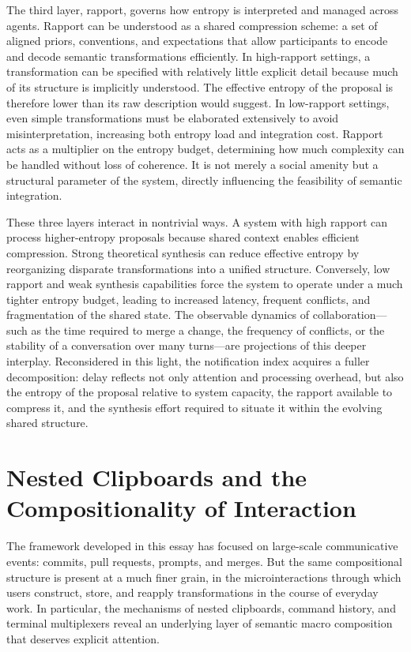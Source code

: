 \documentclass[12pt, letterpaper]{article}
\begin{document}
The third layer, rapport, governs how entropy is interpreted and managed across agents. Rapport can be understood as a shared compression scheme: a set of aligned priors, conventions, and expectations that allow participants to encode and decode semantic transformations efficiently. In high-rapport settings, a transformation can be specified with relatively little explicit detail because much of its structure is implicitly understood. The effective entropy of the proposal is therefore lower than its raw description would suggest. In low-rapport settings, even simple transformations must be elaborated extensively to avoid misinterpretation, increasing both entropy load and integration cost. Rapport acts as a multiplier on the entropy budget, determining how much complexity can be handled without loss of coherence. It is not merely a social amenity but a structural parameter of the system, directly influencing the feasibility of semantic integration.

These three layers interact in nontrivial ways. A system with high rapport can process higher-entropy proposals because shared context enables efficient compression. Strong theoretical synthesis can reduce effective entropy by reorganizing disparate transformations into a unified structure. Conversely, low rapport and weak synthesis capabilities force the system to operate under a much tighter entropy budget, leading to increased latency, frequent conflicts, and fragmentation of the shared state. The observable dynamics of collaboration---such as the time required to merge a change, the frequency of conflicts, or the stability of a conversation over many turns---are projections of this deeper interplay. Reconsidered in this light, the notification index acquires a fuller decomposition: delay reflects not only attention and processing overhead, but also the entropy of the proposal relative to system capacity, the rapport available to compress it, and the synthesis effort required to situate it within the evolving shared structure.

\section{Nested Clipboards and the Compositionality of Interaction}

The framework developed in this essay has focused on large-scale communicative events: commits, pull requests, prompts, and merges. But the same compositional structure is present at a much finer grain, in the microinteractions through which users construct, store, and reapply transformations in the course of everyday work. In particular, the mechanisms of nested clipboards, command history, and terminal multiplexers reveal an underlying layer of semantic macro composition that deserves explicit attention.
\end{document}
